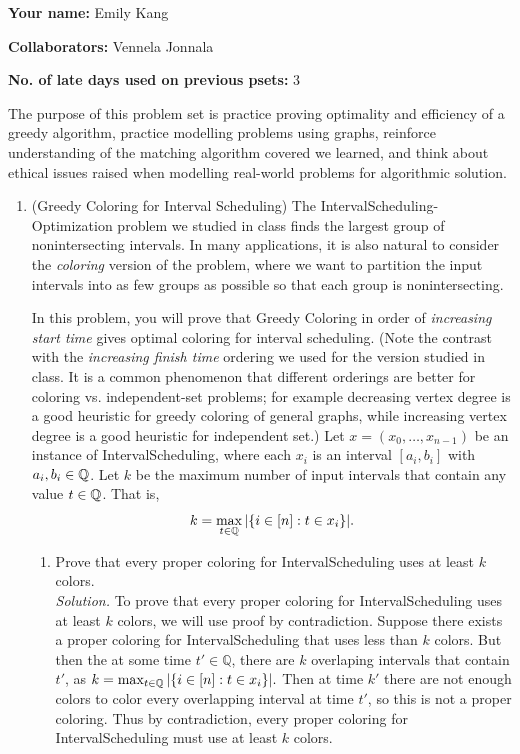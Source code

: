 \documentclass[11pt]{article}
\begin{document}

\textbf{Your name: } Emily Kang

\textbf{Collaborators: } Vennela Jonnala

\textbf{No. of late days used on previous psets: } 3


The purpose of this problem set is practice proving optimality and efficiency of a greedy algorithm, practice modelling problems using graphs, reinforce understanding of the matching algorithm covered we learned, and think about ethical issues raised when modelling real-world problems for algorithmic solution.

\begin{enumerate}
    \item (Greedy Coloring for Interval Scheduling) The IntervalScheduling-Optimization problem we studied in class finds the largest group of nonintersecting intervals. 
    In many applications, it is also natural to consider the {\em coloring} version of the problem, where we want to partition the input intervals into as few groups as possible so that each group is nonintersecting.
 
    In this problem, you will prove that Greedy Coloring in order of {\em increasing start time} gives optimal coloring for interval scheduling.  (Note the contrast with the {\em increasing finish time} ordering we used for the version studied in class. It is a common phenomenon that different orderings are better for coloring vs. independent-set problems; for example decreasing vertex degree is a good heuristic for greedy coloring of general graphs, while increasing vertex degree is a good heuristic for independent set.)  Let $x=(x_0,\ldots,x_{n-1})$ be an instance of IntervalScheduling, where each $x_i$ is an interval $[a_i,b_i]$ with $a_i,b_i\in \mathbb{Q}$.  Let $k$ be the maximum number of input intervals that contain any value $t\in \mathbb{Q}$.  That is, $$k = \max_{t\in \mathbb{Q}} |\{ i\in [n]: t\in x_i\}|.$$
 
 \begin{enumerate}
     \item Prove that every proper coloring for IntervalScheduling uses at least $k$ colors.\\
     
     \textit{Solution. }To prove that every proper coloring for IntervalScheduling uses at least $k$ colors, we will use proof by contradiction. Suppose there exists a proper coloring for IntervalScheduling that uses less than $k$ colors. But then the at some time $t'\in \mathbb{Q}$, there are $k$ overlaping intervals that contain $t'$, as $k = \max_{t\in \mathbb{Q}} |\{ i\in [n]: t\in x_i\}|.$ Then at time $k'$ there are not enough colors to color every overlapping interval at time $t'$, so this is not a proper coloring. Thus by contradiction, every proper coloring for IntervalScheduling must use at least $k$ colors. \\


\end{enumerate}
\end{enumerate}
\end{document}
